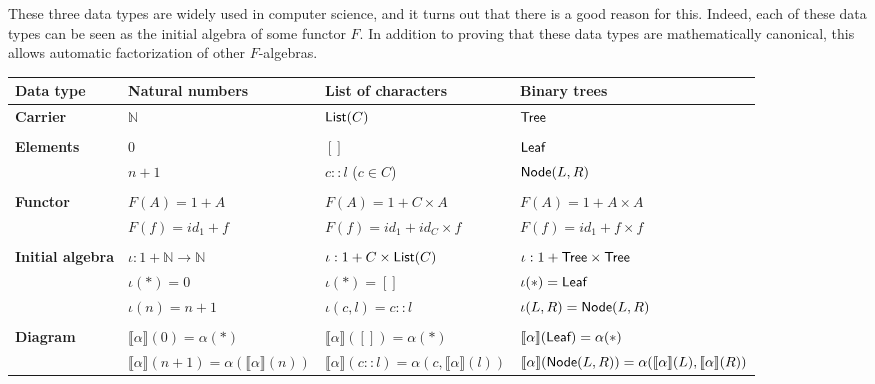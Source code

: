 \documentclass[11pt,a4paper]{article}
\newcommand{\gr}{\textbf}
\newcommand{\N}{\mathbb{N}}
\newcommand{\lb}{\llbracket}
\newcommand{\rb}{\rrbracket}
\newcommand{\info}[1]{\text{{\fontfamily{lmss}\selectfont #1}}}
\newcommand{\List}{\info{List}}
\newcommand{\Tree}{\info{Tree}}
\newcommand{\1}{\mathbbm{1}}
\newcommand{\Leaf}{\info{Leaf}}
\newcommand{\Node}{\info{Node}}
\begin{document}
These three data types are widely used in computer science, and it turns out that there is a good reason for this. Indeed, each of these data types can be seen as the initial algebra of some functor $F$. In addition to proving that these data types are mathematically canonical, this allows automatic factorization of other $F$-algebras.
\begin{center}
\begin{tabular}{|l|l|l|l|}
  \hline
  \gr{Data type} & Natural numbers & List of characters & Binary trees \\
  \hline
  \gr{Carrier} & $\N$ & $\List(C)$ & $\Tree$ \\
  & & & \\
  \gr{Elements} & $0$ & $[]$ & $\Leaf$ \\
  & $n+1$ & $c::l$ ($c \in C$) & $\Node(L,R)$ \\
  & & & \\
  \gr{Functor} & $F(A) = 1 + A$ & $F(A) = 1 + C \times A$ & $F(A) = 1 + A \times A$ \\
  & $F(f) = id_1 + f$ & $F(f) = id_1 + id_C \times f$ & $F(f) = id_1 + f \times f$ \\
  & & & \\
  \gr{Initial algebra} & $\iota : 1 + \N \to \N$ & $\iota : 1 + C \times \List(C)$ & $\iota : 1 + \Tree \times \Tree$ \\
  & $\iota(*) = 0$ & $\iota(*) = []$ & $\iota(*) = \Leaf$ \\
  & $\iota(n) = n+1$ & $\iota(c,l) = c::l$ & $\iota(L,R) = \Node(L,R)$ \\
  & & & \\
  \gr{Diagram} & $\lb \alpha \rb(0) = \alpha(*)$ & $\lb \alpha \rb([]) = \alpha(*)$ & $\lb \alpha \rb(\Leaf) = \alpha(*)$ \\
  & {\scriptsize $\lb \alpha \rb(n+1) = \alpha(\lb \alpha \rb(n))$} & {\scriptsize $\lb \alpha \rb (c::l)  = \alpha(c,\lb \alpha \rb(l))$} & {\scriptsize $\lb \alpha \rb (\Node(L,R)) = \alpha (\lb \alpha \rb (L) , \lb \alpha \rb (R))$} \\
  \hline
\end{tabular}
\end{center}
\end{document}
